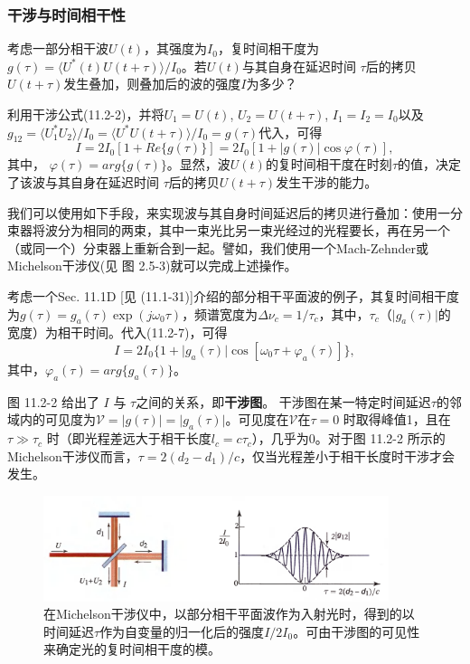 \documentclass[UTF8]{ctexart}
\numberwithin{figure}{subsection}
\numberwithin{table}{subsection}
\begin{document}
\subsubsection{干涉与时间相干性}
\endgroup
考虑一部分相干波$ U(t) $，其强度为$ I_0 $，复时间相干度为 $ g(\tau) = \langle U^\ast (t) U(t + \tau) \rangle / I_0 $。若$ U(t) $与其自身在延迟时间 $ \tau $后的拷贝$ U(t + \tau) $发生叠加，则叠加后的波的强度$ I $为多少？
\par 利用干涉公式(11.2-2)，并将$ U_1 = U(t) $, $ U_2 = U(t + \tau) $, $ I_1 = I_2 = I_0 $以及$ g_{12} = \langle U_1^\ast U_2 \rangle / I_0 = \langle U^\ast U(t + \tau) \rangle / I_0 = g(\tau) $代入，可得
\begin{equation}
I = 2 I_0 [1 + Re\{g(\tau)\}] = 2 I_0 [1 + \lvert g(\tau) \rvert \cos \varphi (\tau)],
\end{equation}
其中， $ \varphi (\tau) = arg\{g(\tau)\}$。显然，波$ U(t) $的复时间相干度在时刻$\tau$的值，决定了该波与其自身在延迟时间 $ \tau $后的拷贝$ U(t + \tau) $发生干涉的能力。
\par 我们可以使用如下手段，来实现波与其自身时间延迟后的拷贝进行叠加：使用一分束器将波分为相同的两束，其中一束光比另一束光经过的光程要长，再在另一个（或同一个）分束器上重新合到一起。譬如，我们使用一个Mach-Zehnder或Michelson干涉仪(见 图 2.5-3)就可以完成上述操作。
\par 考虑一个Sec. 11.1D [见 (11.1-31)]介绍的部分相干平面波的例子，其复时间相干度为$ g(\tau) = g_a (\tau) \exp(j\omega_0 \tau) $，频谱宽度为$ \Delta \nu_c = 1 / \tau_c $，其中，$ \tau_c $（$ \lvert g_a (\tau) \rvert $的宽度）为相干时间。代入(11.2-7)，可得
\begin{equation}
I = 2 I_0 \{1 + \lvert g_a (\tau) \rvert \cos [\omega_0 \tau + \varphi_a (\tau)]\} ,
\end{equation}
其中，$ \varphi_a (\tau) = arg \{g_a (\tau)\} $。
\par 图 11.2-2 给出了 $ I $ 与 $ \tau $之间的关系，即\textbf{干涉图}。 干涉图在某一特定时间延迟$ \tau $的邻域内的可见度为$ \mathcal{V} = \lvert g(\tau) \rvert = \lvert g_a (\tau) \rvert $。可见度在$ \mathcal{V}$在$ \tau = 0 $ 时取得峰值1，且在$ \tau \gg \tau_c $ 时（即光程差远大于相干长度$ l_c = c\tau_c $），几乎为0。对于图 11.2-2 所示的Michelson干涉仪而言，$\tau = 2(d_2 - d_1) / c $，仅当光程差小于相干长度时干涉才会发生。
 \begin{figure}[H]
\centering
\includegraphics[width=0.9\textwidth]{11_2_2.PNG}
\caption{在Michelson干涉仪中，以部分相干平面波作为入射光时，得到的以时间延迟$ \tau $作为自变量的归一化后的强度$ I / 2I_0 $。可由干涉图的可见性来确定光的复时间相干度的模。}
\label{fig: 11_2_2}
\end{figure}
\end{document}
